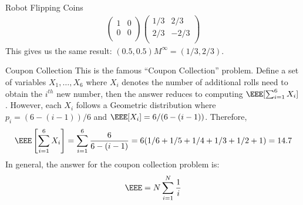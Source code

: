 \documentclass[oldfontcommands]{memoir}
\begin{document}
{\begin{answer}{Robot Flipping Coins}
\begin{align*}
    \begin{pmatrix}
    1 & 0\\
    0 & 0\\		
    \end{pmatrix}
    \begin{pmatrix}
    1/3 & 2/3\\
    2/3 & -2/3\\		
    \end{pmatrix}
\end{align*}
This gives us the same result: $(0.5, 0.5) M^\infty = (1/3, 2/3)$.\end{answer}
\begin{answer}{Coupon Collection}
This is the famous ``Coupon Collection'' problem. Define a set of variables $X_1, \dots, X_6$ where $X_i$ denotes the number of additional rolls need to obtain the $i^{th}$ new number, then the answer reduces to computing $\EEE[\sum_{i=1}^6 X_i]$. However, each $X_i$ follows a Geometric distribution where $p_i = (6 - (i-1)) / 6$ and $\EEE[X_i] = 6 / (6 - (i-1))$. Therefore,
\begin{align*}
    \EEE\left[\sum_{i=1}^6 X_i\right] = \sum_{i=1}^6 \frac{6}{6- (i-1)} = 6(1/6 + 1/5 + 1/4 + 1/3 + 1/2 + 1) = 14.7
\end{align*}
In general, the answer for the coupon collection problem is:
\begin{align*}
\EEE = N\sum_{i=1}^N \frac{1}{i}
\end{align*}


\end{answer}}
\end{document}
